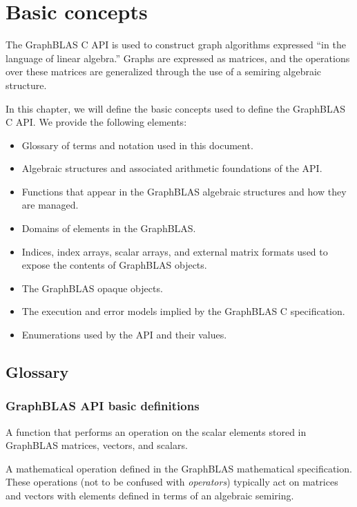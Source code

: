 \chapter{Basic concepts}
\label{Chp:Concepts}

The GraphBLAS C API is used to construct  
graph algorithms expressed ``in the language of linear algebra.''
Graphs are expressed as matrices, and the operations over 
these matrices are generalized through the use of a
semiring algebraic structure.

In this chapter, we will define the basic concepts used to
define the GraphBLAS C API.  We provide the following elements:

\begin{itemize}
\item Glossary of terms and notation used in this document.  
\item Algebraic structures and associated arithmetic foundations of the API.
\item Functions that appear in the GraphBLAS algebraic structures and how they are managed.
\item Domains of elements in the GraphBLAS.
\item Indices, index arrays, scalar arrays, and external matrix formats used to expose the contents of GraphBLAS objects.
\item The GraphBLAS opaque objects. 
\item The execution and error models implied by the GraphBLAS C specification.
\item Enumerations used by the API and their values.
\end{itemize}

\section{Glossary}


\subsection{GraphBLAS API basic definitions}

\glossBegin

 A function that performs an operation on the scalar elements 
stored in GraphBLAS matrices, vectors, and scalars.

 A mathematical operation defined in the
GraphBLAS mathematical specification. These operations (not to be confused with \emph{operators}) typically act
on matrices and vectors with elements defined in terms of an algebraic semiring. 
\glossEnd

